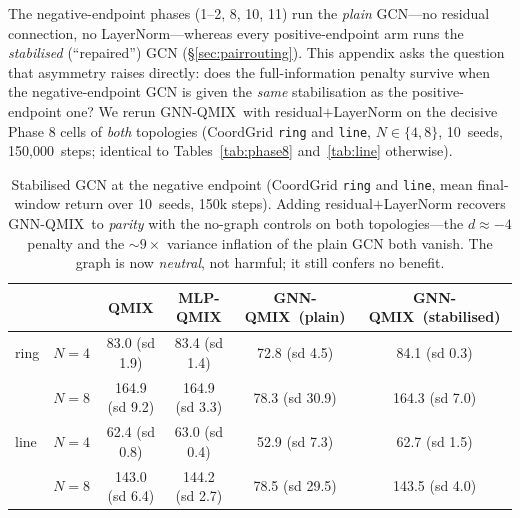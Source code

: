 \documentclass[10pt]{article}
\newcommand{\algoname}[1]{\textsc{#1}}
\newcommand{\qmix}{\algoname{QMIX}}
\newcommand{\gnnqmix}{\algoname{GNN-QMIX}}
\newcommand{\mlpqmix}{\algoname{MLP-QMIX}}
\newcommand{\PEsteps}{150{,}000}      %
\newcommand{\PEseeds}{10}             %
\begin{document}
The negative-endpoint phases (1--2, 8, 10, 11) run the \emph{plain}
GCN---no residual connection, no LayerNorm---whereas every positive-endpoint
arm runs the \emph{stabilised} (``repaired'') GCN
(\S\ref{sec:pairrouting}). This appendix asks the question that asymmetry
raises directly: does the full-information penalty survive when the
negative-endpoint GCN is given the \emph{same} stabilisation as the
positive-endpoint one? We rerun \gnnqmix\ with residual$+$LayerNorm on the
decisive Phase 8 cells of \emph{both} topologies (CoordGrid \texttt{ring}
and \texttt{line}, $N\in\{4,8\}$,
\PEseeds\ seeds, \PEsteps\ steps; identical to Tables~\ref{tab:phase8}
and~\ref{tab:line} otherwise).

\begin{table}[!ht]
  \centering
  \small
  \caption{Stabilised GCN at the negative endpoint (CoordGrid
  \texttt{ring} and \texttt{line}, mean final-window return over \PEseeds\
  seeds, 150k steps).
  Adding residual$+$LayerNorm recovers \gnnqmix\ to \emph{parity} with the
  no-graph controls on both topologies---the $d{\approx}{-}4$ penalty and the
  ${\sim}9\times$
  variance inflation of the plain GCN both vanish. The graph is now
  \emph{neutral}, not harmful; it still confers no benefit.}
  \label{tab:repaired}
  \begin{tabular}{llcccc}
    \toprule
    & & \qmix & \mlpqmix & \gnnqmix\ (plain) & \gnnqmix\ (stabilised) \\
    \midrule
    ring & $N=4$ & 83.0 (sd 1.9) & 83.4 (sd 1.4) & 72.8 (sd 4.5) & 84.1 (sd 0.3) \\
         & $N=8$ & 164.9 (sd 9.2) & 164.9 (sd 3.3) & 78.3 (sd 30.9) & 164.3 (sd 7.0) \\
    line & $N=4$ & 62.4 (sd 0.8) & 63.0 (sd 0.4) & 52.9 (sd 7.3) & 62.7 (sd 1.5) \\
         & $N=8$ & 143.0 (sd 6.4) & 144.2 (sd 2.7) & 78.5 (sd 29.5) & 143.5 (sd 4.0) \\
    \bottomrule
  \end{tabular}
\end{table}
\end{document}
